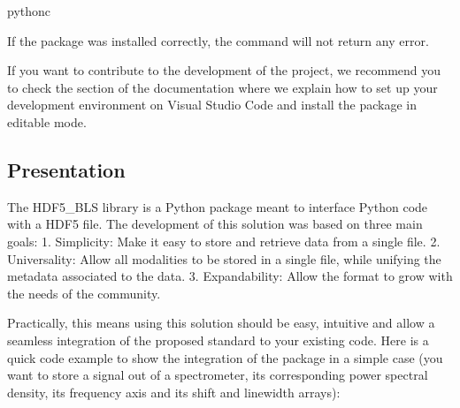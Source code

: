 \documentclass[letterpaper,10pt,english]{sphinxmanual}
\begin{document}
\begin{sphinxVerbatim}[commandchars=\\\{\}]
python\PYGZhy{}c
\end{sphinxVerbatim}

\sphinxAtStartPar
If the package was installed correctly, the command will not return any error.

\sphinxAtStartPar
If you want to contribute to the development of the project, we recommend you to check the {\hyperref[\detokenize{source/developer/setup:developer-setup-vscode}]{}} section of the documentation where we explain how to set up your development environment on Visual Studio Code and install the package in editable mode.


\subsection{Presentation}
\label{\detokenize{source/hdf5_bls_package:presentation}}
\sphinxAtStartPar
The HDF5\_BLS library is a Python package meant to interface Python code with a HDF5 file. The development of this solution was based on three main goals:
1. Simplicity: Make it easy to store and retrieve data from a single file.
2. Universality: Allow all modalities to be stored in a single file, while unifying the metadata associated to the data.
3. Expandability: Allow the format to grow with the needs of the community.

\sphinxAtStartPar
Practically, this means using this solution should be easy, intuitive and allow a seamless integration of the proposed standard to your existing code. Here is a quick code example to show the integration of the package in a simple case (you want to store a signal out of a spectrometer, its corresponding power spectral density, its frequency axis and its shift and linewidth arrays):
\end{document}

